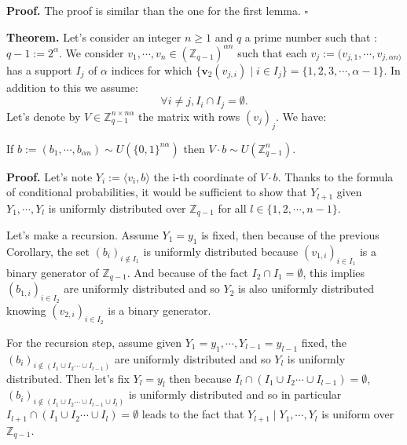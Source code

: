 \documentclass{article}
\begin{document}
\vspace{0.3cm}

\textbf{Proof.} The proof is similar than the one for the first lemma. \hfill $\square$

\vspace{0.3cm}

\textbf{Theorem.}
Let's consider an integer $n \geq 1$ and $q$ a prime number such that : $q-1 := 2^{\alpha}$.
We  consider $v_1,\cdots, v_n \in (\mathbb{Z}_{q-1})^{\alpha n}$ such that each $v_j :=(v_{j,1},\cdots, v_{j,\alpha n)}$ has a support $I_j$ of $\alpha$ indices for which $ \{\textbf{v}_2(v_{j,i}) \mid i \in I_j \} = \{1,2,3,\cdots,\alpha-1\}$. In addition to this we assume:
\[
\forall i \neq j, I_i \cap I_j = \emptyset.
\]
Let's denote by $V \in \mathbb{Z}_{q-1}^{n \times n\alpha}$ the matrix with rows $(v_j)_j$. We have: 

If $b:=(b_1,\cdots,b_{\alpha n}) \sim U(\{0,1\}^{n \alpha})$ then $V \cdot b \sim U(\mathbb{Z}_{q-1}^n)$.

\vspace{0.3cm}

\textbf{Proof.}
Let's note $Y_i := \langle v_i, b\rangle $ the i-th coordinate of $V \cdot b$. Thanks to the formula of conditional probabilities, it would be sufficient to show that $Y_{l+1}$ given $Y_1,\cdots, Y_l$ is uniformly distributed over $\mathbb{Z}_{q-1}$ for all $l\in \{1,2,\cdots , n-1\}$.

\vspace{0.3cm}

Let's make a recursion. Assume $Y_1=y_1$ is fixed, then because of the previous Corollary, the set $(b_{i})_{i \notin I_1}$ is uniformly distributed because $(v_{1,i})_{i \in I_1}$ is a binary generator of $\mathbb{Z}_{q-1}$. And because of the fact $I_2 \cap  I_1 = \emptyset$, this implies $(b_{1,i})_{i \in I_2}$ are uniformly distributed and so $Y_2$ is also uniformly distributed knowing  $(v_{2,i})_{i \in I_2}$ is a binary generator.

\vspace{0.3cm}

For the recursion step, assume given $Y_1 = y_1,\cdots, Y_{l-1} = y_{l-1}$ fixed, the $(b_i)_{i \notin (I_1\cup I_2 \cdots \cup I_{l-1})}$ are uniformly distributed and so $Y_l$ is uniformly distributed. Then let's fix $Y_l = y_l$ then because $I_l \cap (I_1\cup I_2 \cdots \cup I_{l-1}) = \emptyset$, $(b_i)_{i \notin (I_1\cup I_2 \cdots \cup I_{l-1} \cup I_l)}$ is uniformly distributed and so in particular $I_{l+1} \cap (I_1\cup I_2 \cdots \cup I_{l}) = \emptyset$ leads to the fact that $Y_{l+1} \mid Y_1,\cdots, Y_l$ is uniform over $\mathbb{Z}_{q-1}$.
\end{document}
